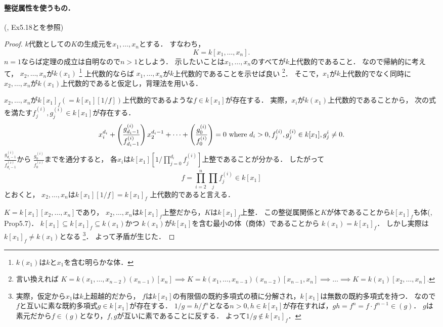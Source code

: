 \paragraph{整従属性を使うもの．}
(\cite{atimac}, Ex5.18と\cite{oneline}を参照)
\begin{proof}
    $k$代数としての$K$の生成元を$x_1,\dots,x_n$とする．
    すなわち，
    \[ K=k[x_1,\dots,x_n]. \]
    $n=1$ならば定理の成立は自明なので$n>1$としよう．
    示したいことは$x_1,\dots,x_n$のすべてが$k$上代数的であること．
    なので帰納的に考えて，
    $x_2,\dots,x_n$が$k(x_1)$
    \footnote{$k(x_1)$は$k$と$x_1$を含む明らかな体．}
    上代数的ならば
    $x_1,\dots,x_n$が$k$上代数的であることを示せば良い
    \footnote
    {
        言い換えれば
        $K=k(x_1,\dots,x_{n-2})(x_{n-1})[x_n] 
        \implies
        K=k(x_1,\dots,x_{n-3})(x_{n-2})[x_{n-1},x_n]
        \implies
        \dots
        \implies K=k(x_1)[x_2,\dots,x_n]$.
    }．
    そこで，$x_1$が$k$上代数的でなく同時に
    $x_2,\dots,x_n$が$k(x_1)$上代数的であると仮定し，背理法を用いる．

    $x_2,\dots,x_n$が$k[x_1]_f(=k[x_1][1/f])$上代数的であるような$f \in k[x_1]$が存在する．
    実際，$x_i$が$k(x_1)$上代数的であることから，
    次の式を満たす$f_{j}^{(i)},g_{j}^{(i)} \in k[x_1]$が存在する．
    \[
        x_i^{d_i}+\left( \frac{g_{d_i-1}^{(i)}}{f_{d_i-1}^{(i)}} \right) x_2^{d_i-1}+\dots+\left(\frac{g_{0}^{(i)}}{f_{0}^{(i)}}\right)=0
        \text{ where } d_i>0, f_{j}^{(i)},g_{j}^{(i)} \in k[x_1], g_{j}^{i} \neq 0.
    \]
    $\frac{g_{d_i-1}^{(i)}}{f_{d_i-1}^{(i)}}$から
    $\frac{g_{0}^{(i)}}{f_{0}^{(i)}}$までを通分すると，
    各$x_i$は$k[x_1]\left[1/\prod_{j=0}^{d_i}f_{j}^{(i)}\right]$上整であることが分かる．
    したがって
    \[ f=\prod_{i=2}^n\prod_{j} f_{j}^{(i)} \in k[x_1] \]とおくと，
    $x_2,\dots,x_n$は$k[x_1]\left[1/f\right]=k[x_1]_f$
    上代数的であると言える．

    $K=k[x_1][x_2,\dots,x_n]$であり，
    $x_2,\dots,x_n$は$k[x_1]_f$上整だから，$K$は$k[x_1]_f$上整．
    この整従属関係と$K$が体であることから$k[x_1]_f$も体(\cite{atimac}, Prop5.7)．
    $k[x_1] \subseteq k[x_1]_f \subseteq k(x_1)$かつ
    $k(x_1)$が$k[x_1]$を含む最小の体（商体）であることから
    $k(x_1)=k[x_1]_f$．
    しかし実際は$k[x_1]_f \neq k(x_1)$となる
    \footnote
    {
    実際，仮定から$x_1$は$k$上超越的だから，
    $f$は$k[x_1]$の有限個の既約多項式の積に分解され，$k[x_1]$は無数の既約多項式を持つ．
    なので$f$と互いに素な既約多項式$g \in k[x_1]$が存在する．
    $1/g=h/f^n$となる$n>0, h \in k[x_1]$が存在すれば，$gh=f^n=f \cdot f^{n-1} \in (g)$．
    $g$は素元だから$f \in (g)$となり，$f,g$が互いに素であることに反する．
    よって$1/g \not \in k[x_1]_f$．
    }．
    よって矛盾が生じた．
\end{proof}


